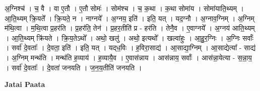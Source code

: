 \documentclass[17pt]{extarticle}
\begin{document}
अ॒ग्निश्च॑ । च॒ वै । वा ए॒तौ । ए॒तौ सोमः॑ । सोम॑श्च । च॒ क॒था । क॒था सोमा॑य । सोमा॑याति॒थ्यम् । आ॒ति॒थ्यम् क्रि॒यते᳚ । क्रि॒यते॒ न । नाग्नये᳚ । अ॒ग्नय॒ इति॑ । इति॒ यत् । यद॒ग्नौ । अ॒ग्नाव॒ग्निम् । अ॒ग्निम् म॑थि॒त्वा । म॒थि॒त्वा प्र॒हर॑ति । प्र॒हर॑ति॒ तेन॑ । प्र॒हर॒तीति॑ प्र - हर॑ति । तेनै॒व । ए॒वाग्नये᳚ । अ॒ग्नय॑ आति॒थ्यम् । आ॒ति॒थ्यम् क्रि॑यते । क्रि॒य॒तेऽथो᳚ । अथो॒ खलु॑ । अथो॒ इत्यथो᳚ । खल्वा॑हुः । आ॒हु॒र॒ग्निः । अ॒ग्निः सर्वाः᳚ । सर्वा॑ दे॒वताः᳚ । दे॒वता॒ इति॑ । इति॒ यत् । यद्‍ध॒विः । ह॒विरा॒साद्य॑ । आ॒साद्या॒ग्निम् । आ॒साद्येत्या᳚ - साद्य॑ । अ॒ग्निम् मन्थ॑ति । मन्थ॑ति ह॒व्याय॑ । ह॒व्यायै॒व । ए॒वास॑न्नाय । आस॑न्नाय॒ सर्वाः᳚ । आस॑न्ना॒येत्या - स॒न्ना॒य॒ । सर्वा॑ दे॒वताः᳚ । दे॒वता॑ जनयति । ज॒न॒य॒तीति॑ जनयति । \newline

\textbf{Jatai Paata} \newline
\end{document}
